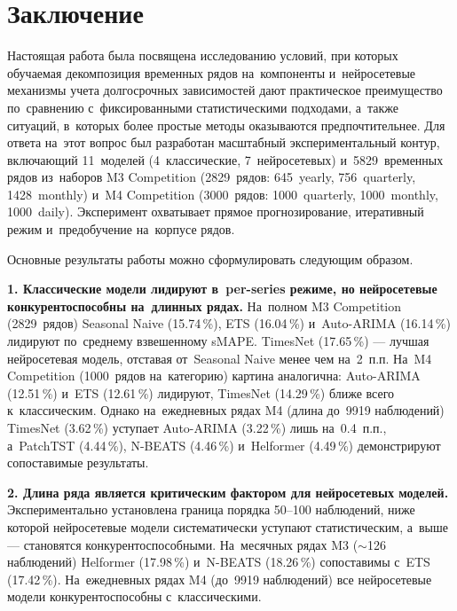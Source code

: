 
\newpage
\section*{Заключение}

Настоящая работа была посвящена исследованию условий, при которых
обучаемая декомпозиция временных рядов на~компоненты и~нейросетевые
механизмы учета долгосрочных зависимостей дают практическое
преимущество по~сравнению с~фиксированными статистическими подходами,
а~также ситуаций, в~которых более простые методы оказываются
предпочтительнее. Для ответа на~этот вопрос был разработан
масштабный экспериментальный контур, включающий 11~моделей
(4~классические, 7~нейросетевых) и~5829~временных рядов
из~наборов M3 Competition (2829~рядов: 645~yearly, 756~quarterly,
1428~monthly) и~M4 Competition (3000~рядов: 1000~quarterly,
1000~monthly, 1000~daily). Эксперимент охватывает прямое
прогнозирование, итеративный режим и~предобучение на~корпусе рядов.

Основные результаты работы можно сформулировать следующим образом.

\textbf{1. Классические модели лидируют в~per-series режиме,
но нейросетевые конкурентоспособны на~длинных рядах.}
На~полном M3 Competition (2829~рядов) Seasonal Naive (15.74\,\%),
ETS (16.04\,\%) и~Auto-ARIMA (16.14\,\%) лидируют по~среднему
взвешенному sMAPE. TimesNet (17.65\,\%) --- лучшая нейросетевая
модель, отставая от~Seasonal Naive менее чем на~2~п.п. На~M4
Competition (1000~рядов на~категорию) картина аналогична:
Auto-ARIMA (12.51\,\%) и~ETS (12.61\,\%) лидируют, TimesNet
(14.29\,\%) ближе всего к~классическим. Однако на~ежедневных
рядах M4 (длина до~9919 наблюдений) TimesNet (3.62\,\%) уступает
Auto-ARIMA (3.22\,\%) лишь на~0.4~п.п., а~PatchTST (4.44\,\%),
N-BEATS (4.46\,\%) и~Helformer (4.49\,\%) демонстрируют
сопоставимые результаты.

\textbf{2. Длина ряда является критическим фактором для
нейросетевых моделей.} Экспериментально установлена граница порядка
50--100 наблюдений, ниже которой нейросетевые модели систематически
уступают статистическим, а~выше --- становятся конкурентоспособными.
На~месячных рядах M3 ($\sim$126 наблюдений) Helformer (17.98\,\%)
и~N-BEATS (18.26\,\%) сопоставимы с~ETS (17.42\,\%). На~ежедневных
рядах M4 (до~9919 наблюдений) все нейросетевые модели
конкурентоспособны с~классическими.

